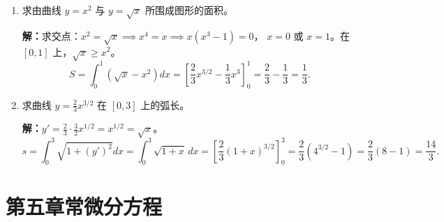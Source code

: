 \documentclass[12pt,a4paper]{ctexart}
\begin{document}
\begin{enumerate}[leftmargin=*,label=\arabic*.,start=20]
    \textbf{解：}当 $p \neq 1$ 时，
    \[
    \int_1^b \frac{dx}{x^p} = \left[\frac{x^{1-p}}{1-p}\right]_1^b
    = \frac{b^{1-p}-1}{1-p}.
    \]
    当 $p > 1$ 时，$1-p < 0$，$\lim_{b\to\infty} b^{1-p} = 0$，
    故 $\int_1^{+\infty} x^{-p} dx = \frac{1}{p-1}$，收敛。

    当 $p < 1$ 时，$1-p > 0$，$\lim_{b\to\infty} b^{1-p} = \infty$，发散。

    当 $p = 1$ 时，$\int_1^{+\infty} \frac{dx}{x} = \lim_{b\to\infty}\ln b = \infty$，发散。

    综上：$\int_1^{+\infty} x^{-p} dx$ 在 $p>1$ 时收敛，在 $p \le 1$ 时发散。

  \item 求由曲线 $y = x^2$ 与 $y = \sqrt{x}$ 所围成图形的面积。

    \textbf{解：}求交点：$x^2 = \sqrt{x} \implies x^4 = x \implies x(x^3-1)=0$，
    $x=0$ 或 $x=1$。在 $[0,1]$ 上，$\sqrt{x} \ge x^2$。
    \[
    S = \int_0^1 (\sqrt{x} - x^2) dx
      = \left[\frac{2}{3}x^{3/2} - \frac{1}{3}x^3\right]_0^1
      = \frac{2}{3} - \frac{1}{3}
      = \frac{1}{3}.
    \]

  \item 求曲线 $y = \frac{2}{3}x^{3/2}$ 在 $[0,3]$ 上的弧长。

    \textbf{解：}$y' = \frac{2}{3}\cdot\frac{3}{2}x^{1/2} = x^{1/2} = \sqrt{x}$。
    \[
    s = \int_0^3 \sqrt{1+(y')^2} dx
      = \int_0^3 \sqrt{1+x} \, dx
      = \left[\frac{2}{3}(1+x)^{3/2}\right]_0^3
      = \frac{2}{3}(4^{3/2} - 1)
      = \frac{2}{3}(8-1)
      = \frac{14}{3}.
    \]
\end{enumerate}

\section*{第五章\quad 常微分方程}
\end{document}
